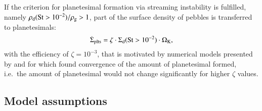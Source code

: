\documentclass{aa}
\begin{document}
If the criterion for planetesimal formation via streaming instability is fulfilled, namely $\rho_{\rm d}({\rm St}>10^{-2})/\rho_{\rm g} > 1$, part of the surface density of pebbles is transferred to planetesimals:
\begin{equation}
\dot{\Sigma}_{\rm{plts}} = \zeta\cdot\Sigma_{\rm d}({\rm St}>10^{-2})\cdot\Omega_{\rm K},
\end{equation}
with the efficiency of $\zeta = 10^{-3}$, that is motivated by numerical models presented by \citet{2016ApJ...822...55S} and for which \citet{2016A&A...594A.105D} found convergence of the amount of planetesimal formed, i.e.~the amount of planetesimal would not change significantly for higher $\zeta$ values. 

\subsection{Model assumptions}
\end{document}
